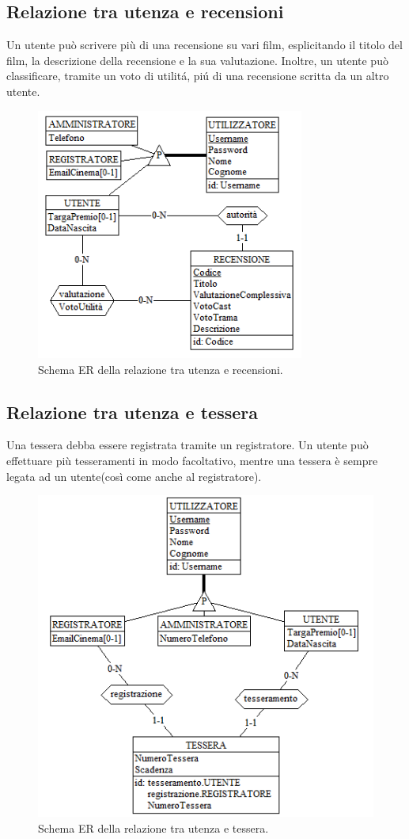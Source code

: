 \documentclass[a4paper,12pt]{report}
\begin{document}
	\subsection{Relazione tra utenza e recensioni}
	Un utente può scrivere più di una recensione su vari film, esplicitando il titolo del film, la descrizione della recensione e la sua valutazione. Inoltre, un utente può classificare, tramite un voto di utilitá, piú di una recensione scritta da un altro utente.
	\begin{figure}[H]
		\centering
		\includegraphics[width=250pt]{ER/utenzarecensione.png}
		\caption{Schema ER della relazione tra utenza e recensioni.}
	\end{figure}
	\subsection{Relazione tra utenza e tessera}
	Una tessera debba essere registrata tramite un registratore. Un utente può effettuare più tesseramenti in modo facoltativo, mentre una tessera è sempre legata ad un utente(così come anche al registratore). %
	\begin{figure}[H]
		\centering
		\includegraphics[width=0.7\linewidth]{ER/utenzatessera.png}
		\caption{Schema ER della relazione tra utenza e tessera.}
	\end{figure}
	
\end{document}
